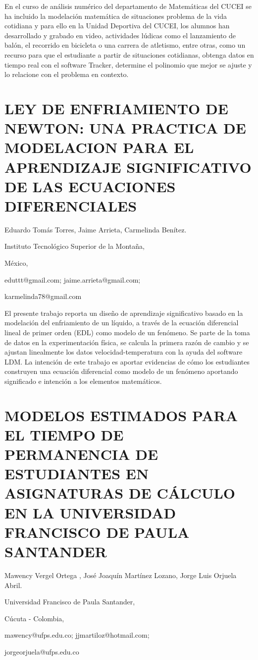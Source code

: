 En el curso de análisis numérico del departamento de Matemáticas del
CUCEI se ha incluido la modelación matemática de situaciones problema
de la vida cotidiana y para ello en la Unidad Deportiva del CUCEI,
los alumnos han desarrollado y grabado en video, actividades lúdicas
como el lanzamiento de balón, el recorrido en bicicleta o una carrera
de atletismo, entre otras, como un recurso para que el estudiante
a partir de situaciones cotidianas, obtenga datos en tiempo real con
el software Tracker, determine el polinomio que mejor se ajuste y
lo relacione con el problema en contexto.


\section{LEY DE ENFRIAMIENTO DE NEWTON: UNA PRACTICA DE MODELACION PARA EL
APRENDIZAJE SIGNIFICATIVO DE LAS ECUACIONES DIFERENCIALES}

\begin{datos}

Eduardo Tomás Torres, Jaime Arrieta, Carmelinda Benítez.

Instituto Tecnológico Superior de la Montaña,

México,

eduttt@gmail.com; jaime.arrieta@gmail.com;

karmelinda78@gmail.com

\end{datos}

El presente trabajo reporta un diseño de aprendizaje significativo
basado en la modelación del enfriamiento de un líquido, a través de
la ecuación diferencial lineal de primer orden (EDL) como modelo de
un fenómeno. Se parte de la toma de datos en la experimentación física,
se calcula la primera razón de cambio y se ajustan linealmente los
datos velocidad-temperatura con la ayuda del software LDM. La intención
de este trabajo es aportar evidencias de cómo los estudiantes construyen
una ecuación diferencial como modelo de un fenómeno aportando significado
e intención a los elementos matemáticos.


\section{MODELOS ESTIMADOS PARA EL TIEMPO DE PERMANENCIA DE ESTUDIANTES EN
ASIGNATURAS DE CÁLCULO EN LA UNIVERSIDAD FRANCISCO DE PAULA SANTANDER}

\begin{datos}

Mawency Vergel Ortega , José Joaquín Martínez Lozano, Jorge Luis Orjuela
Abril.

Universidad Francisco de Paula Santander,

Cúcuta - Colombia,

mawency@ufps.edu.co; jjmartiloz@hotmail.com;

jorgeorjuela@ufps.edu.co 

\end{datos}

